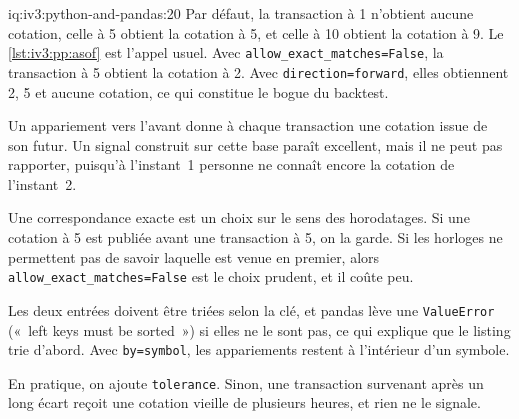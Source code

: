 \begin{solution}{iq:iv3:python-and-pandas:20}
Par défaut, la transaction à 1 n'obtient aucune cotation, celle à 5 obtient la cotation à 5, et celle à 10 obtient la cotation à 9. Le \cref{lst:iv3:pp:asof} est l'appel usuel. Avec \texttt{allow\_exact\_matches=False}, la transaction à 5 obtient la cotation à 2. Avec \texttt{direction=\textquotesingle forward\textquotesingle}, elles obtiennent 2, 5 et aucune cotation, ce qui constitue le bogue du backtest.
\label{lst:iv3:pp:asof}

Un appariement vers l'avant donne à chaque transaction une cotation issue de son futur. Un signal construit sur cette base paraît excellent, mais il ne peut pas rapporter, puisqu'à l'instant~1 personne ne connaît encore la cotation de l'instant~2.

Une correspondance exacte est un choix sur le sens des horodatages. Si une cotation à 5 est publiée avant une transaction à 5, on la garde. Si les horloges ne permettent pas de savoir laquelle est venue en premier, alors \texttt{allow\_exact\_matches=False} est le choix prudent, et il coûte peu.

Les deux entrées doivent être triées selon la clé, et pandas lève une \texttt{ValueError} («~left keys must be sorted~») si elles ne le sont pas, ce qui explique que le listing trie d'abord. Avec \texttt{by=\textquotesingle symbol\textquotesingle}, les appariements restent à l'intérieur d'un symbole.

En pratique, on ajoute \texttt{tolerance}. Sinon, une transaction survenant après un long écart reçoit une cotation vieille de plusieurs heures, et rien ne le signale.

\end{solution}

